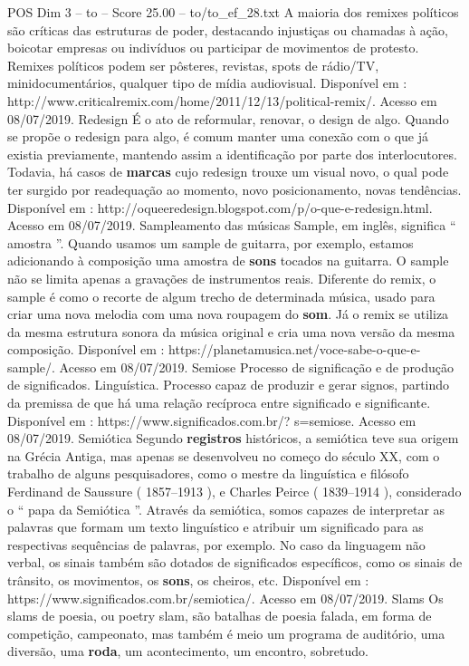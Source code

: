 \begin{textsample}{POS Dim 3 – to – Score 25.00 – to/to\_ef\_28.txt}
A maioria dos remixes políticos são críticas das estruturas de poder, destacando injustiças ou chamadas à ação, boicotar empresas ou indivíduos ou participar de movimentos de protesto.
Remixes políticos podem ser pôsteres, revistas, spots de rádio/TV, minidocumentários, qualquer tipo de mídia audiovisual.
Disponível em : http://www.criticalremix.com/home/2011/12/13/political-remix/.
Acesso em 08/07/2019.
Redesign É o ato de reformular, renovar, o design de algo.
Quando se propõe o redesign para algo, é comum manter uma conexão com o que já existia previamente, mantendo assim a identificação por parte dos interlocutores.
Todavia, há casos de \textbf{marcas} cujo redesign trouxe um visual novo, o qual pode ter surgido por readequação ao momento, novo posicionamento, novas tendências.
Disponível em : http://oqueeredesign.blogspot.com/p/o-que-e-redesign.html.
Acesso em 08/07/2019.
Sampleamento das músicas Sample, em inglês, significa “ amostra ”.
Quando usamos um sample de guitarra, por exemplo, estamos adicionando à composição uma amostra de \textbf{sons} tocados na guitarra.
O sample não se limita apenas a gravações de instrumentos reais.
Diferente do remix, o sample é como o recorte de algum trecho de determinada música, usado para criar uma nova melodia com uma nova roupagem do \textbf{som}.
Já o remix se utiliza da mesma estrutura sonora da música original e cria uma nova versão da mesma composição.
Disponível em : https://planetamusica.net/voce-sabe-o-que-e-sample/.
Acesso em 08/07/2019.
Semiose Processo de significação e de produção de significados.
Linguística.
Processo capaz de produzir e gerar signos, partindo da premissa de que há uma relação recíproca entre significado e significante.
Disponível em : https://www.significados.com.br/? s=semiose.
Acesso em 08/07/2019.
Semiótica Segundo \textbf{registros} históricos, a semiótica teve sua origem na Grécia Antiga, mas apenas se desenvolveu no começo do século XX, com o trabalho de alguns pesquisadores, como o mestre da linguística e filósofo Ferdinand de Saussure ( 1857–1913 ), e Charles Peirce ( 1839–1914 ), considerado o “ papa da Semiótica ”.
Através da semiótica, somos capazes de interpretar as palavras que formam um texto linguístico e atribuir um significado para as respectivas sequências de palavras, por exemplo.
No caso da linguagem não verbal, os sinais também são dotados de significados específicos, como os sinais de trânsito, os movimentos, os \textbf{sons}, os cheiros, etc.
Disponível em : https://www.significados.com.br/semiotica/.
Acesso em 08/07/2019.
Slams Os slams de poesia, ou poetry slam, são batalhas de poesia falada, em forma de competição, campeonato, mas também é meio um programa de auditório, uma diversão, uma \textbf{roda}, um acontecimento, um encontro, sobretudo.

\end{textsample}
